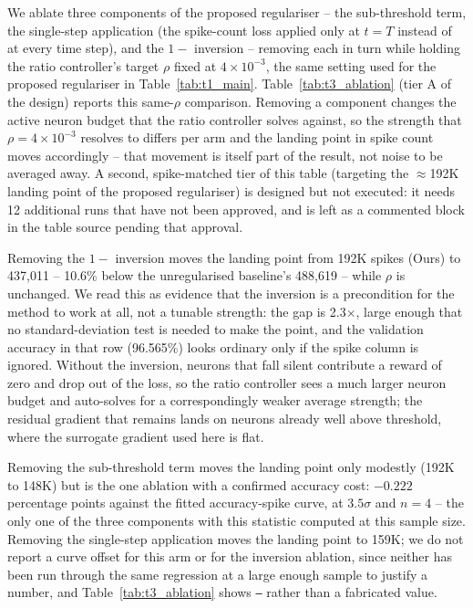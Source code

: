We ablate three components of the proposed regulariser -- the sub-threshold
term, the single-step application (the spike-count loss applied only at
$t=T$ instead of at every time step), and the $1{-}$ inversion -- removing
each in turn while holding the ratio controller's target $\rho$ fixed at
$4\times10^{-3}$, the same setting used for the proposed regulariser in
Table~\ref{tab:t1_main}. Table~\ref{tab:t3_ablation} (tier A of the design)
reports this same-$\rho$ comparison. Removing a component
changes the active neuron budget that the ratio controller solves against,
so the strength that $\rho=4\times10^{-3}$ resolves to differs per arm and
the landing point in spike count moves accordingly -- that movement is
itself part of the result, not noise to be averaged away. A second,
spike-matched tier of this table (targeting the $\approx$192K landing point
of the proposed regulariser) is designed but not executed: it needs 12
additional runs that have not been approved, and is left as a commented
block in the table source pending that approval.

Removing the $1{-}$ inversion moves the landing point from 192K spikes
(Ours) to 437,011 -- 10.6\% below the unregularised baseline's 488,619 --
while $\rho$ is unchanged. We read this as evidence that the inversion is a
precondition for the method to work at all, not a tunable strength: the gap
is 2.3$\times$, large enough that no standard-deviation test is needed to
make the point, and the validation accuracy in that row (96.565\%) looks
ordinary only if the spike column is ignored. Without the inversion,
neurons that fall silent contribute a reward of zero and drop out of the
loss, so the ratio controller sees a much larger neuron budget and
auto-solves for a correspondingly weaker average strength; the residual
gradient that remains lands on neurons already well above threshold, where
the surrogate gradient used here is flat.

Removing the sub-threshold term moves the landing point only modestly (192K
to 148K) but is the one ablation with a confirmed accuracy cost: $-0.222$
percentage points against the fitted accuracy-spike curve, at $3.5\sigma$
and $n=4$ -- the only one of the three components with this statistic
computed at this sample size. Removing the single-step application moves
the landing point to 159K; we do not report a curve offset for this arm or
for the inversion ablation, since neither has been run through the same
regression at a large enough sample to justify a number, and
Table~\ref{tab:t3_ablation} shows \texttt{--} rather than a fabricated
value.


